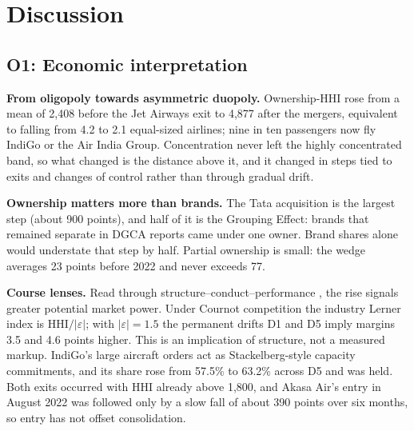 \documentclass[12pt,a4paper]{article}
\newif\ifoneon
\newcommand{\oneHL}{\par\oneontrue\color{orange}\captionsetup{font+={color=blue}}}
\begin{document}
\section{Discussion}
{\oneHL \subsection{O1: Economic interpretation}
\textbf{From oligopoly towards asymmetric duopoly.} Ownership-HHI rose from a mean of 2,408 before the Jet Airways exit to 4,877 after the mergers, equivalent to falling from 4.2 to 2.1 equal-sized airlines; nine in ten passengers now fly IndiGo or the Air India Group. Concentration never left the highly concentrated band, so what changed is the distance above it, and it changed in steps tied to exits and changes of control rather than through gradual drift.

\textbf{Ownership matters more than brands.} The Tata acquisition is the largest step (about 900 points), and half of it is the Grouping Effect: brands that remained separate in DGCA reports came under one owner. Brand shares alone would understate that step by half. Partial ownership is small: the wedge averages 23 points before 2022 and never exceeds 77.

\textbf{Course lenses.} Read through structure--conduct--performance \parencite{gandhi2026marketstructure}, the rise signals greater potential market power. Under Cournot competition the industry Lerner index is HHI$/|\varepsilon|$; with $|\varepsilon|=1.5$ the permanent drifts D1 and D5 imply margins 3.5 and 4.6 points higher. This is an implication of structure, not a measured markup. IndiGo's large aircraft orders act as Stackelberg-style capacity commitments, and its share rose from 57.5\% to 63.2\% across D5 and was held. Both exits occurred with HHI already above 1,800, and Akasa Air's entry in August 2022 was followed only by a slow fall of about 390 points over six months, so entry has not offset consolidation.

}
\end{document}
